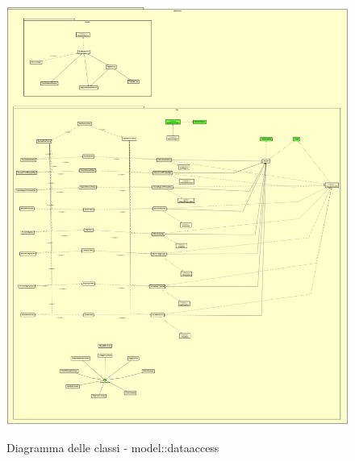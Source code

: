 \documentclass[../DefinizioneDiProdotto.tex]{subfiles}
\begin{document}
\begin{appendices}
		\begin{figure}
			\includegraphics[width=\textwidth]{diagrams/ModelCompleteNoMethods/PNGpackage/dataaccess}
			\label{modelPackage}
			\caption{Diagramma delle classi - model::dataaccess}
		\end{figure}

\end{appendices}
\end{document}
